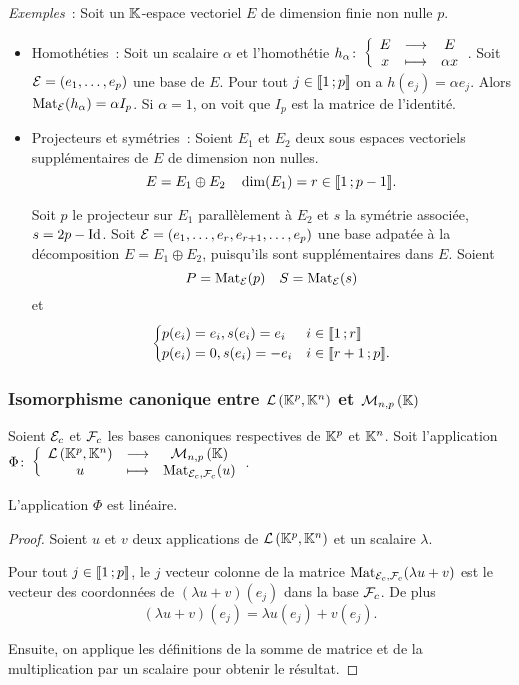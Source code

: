 \emph{Exemples}~: Soit un \(\mathbb{K}\)-espace vectoriel \(E\) de dimension finie non nulle \(p\).
\begin{itemize}
\item Homothéties~: Soit un scalaire \(\alpha\) et l'homothétie \(h_\alpha\colon \left\{\begin{array}{ccc} E & \longrightarrow &E\\ x & \longmapsto & \alpha x \end{array} \right.\). Soit \(\mathcal{E}=(e_1,\ldots, e_p)\) une base de \(E\). Pour tout \(j \in \mathopen{\llbracket}1\mathclose{}\mathpunct{};p\mathclose{\rrbracket}\) on a \(h(e_j)=\alpha e_j\). Alors \(\mathrm{Mat}_{\mathcal{E}}(h_\alpha)=\alpha I_p\). Si \(\alpha=1\), on voit que \(I_p\) est la matrice de l'identité.
\item Projecteurs et symétries~: Soient \(E_1\) et \(E_2\) deux sous espaces vectoriels supplémentaires de \(E\) de dimension non nulles.
  \begin{equation}
    E=E_1 \oplus E_2 \quad \dim(E_1)=r \in \mathopen{\llbracket}1\mathclose{}\mathpunct{};p-1\mathclose{\rrbracket}.
  \end{equation}

Soit \(p\) le projecteur sur \(E_1\) parallèlement à \(E_2\) et \(s\) la symétrie associée, \(s=2p -\operatorname{Id}\). Soit \(\mathcal{E}=(e_1, \ldots, e_r, e_{r+1}, \ldots, e_p)\) une base adpatée à la décomposition \(E=E_1 \oplus E_2\), puisqu'ils sont supplémentaires dans \(E\). Soient
\begin{equation}
  P=\mathrm{Mat}_{\mathcal{E}}(p) \quad S=\mathrm{Mat}_{\mathcal{E}}(s)
\end{equation}
et
\begin{equation}
  \begin{cases}
    p(e_i)=e_i, s(e_i)=e_i & i \in \mathopen{\llbracket}1\mathclose{}\mathpunct{};r\mathclose{\rrbracket} \\
    p(e_i)=0, s(e_i)=-e_i & i \in \mathopen{\llbracket}r+1\mathclose{}\mathpunct{};p\mathclose{\rrbracket}.
  \end{cases}
\end{equation}
\end{itemize}

\subsubsection{Isomorphisme canonique entre \(\mathcal{L}\left(\mathbb{K}^p,\mathbb{K}^n\right)\) et \(\mathcal{M}_{n,p}\left(\mathbb{K}\right)\)}


Soient \(\mathcal{E}_c\) et \(\mathcal{F}_c\) les bases canoniques respectives de \(\mathbb{K}^p\) et \(\mathbb{K}^n\). Soit l'application \(\Phi\colon \left\{\begin{array}{ccc} \mathcal{L}\left(\mathbb{K}^p,\mathbb{K}^n\right) & \longrightarrow &\mathcal{M}_{n,p}\left(\mathbb{K}\right)\\ u & \longmapsto & \mathrm{Mat}_{\mathcal{E}_c,\mathcal{F}_c}(u) \end{array} \right.\).

\begin{prop}
  L'application \(\Phi\) est linéaire.
\end{prop}
\begin{proof}
  Soient \(u\) et \(v\) deux applications de \(\mathcal{L}\left(\mathbb{K}^p,\mathbb{K}^n\right)\) et un scalaire \(\lambda\). 

Pour tout \(j \in \mathopen{\llbracket}1\mathclose{}\mathpunct{};p\mathclose{\rrbracket}\), le \(j\)\ieme{} vecteur colonne de la matrice \(\mathrm{Mat}_{\mathcal{E}_c,\mathcal{F}_c}(\lambda u+v)\) est le vecteur des coordonnées de \((\lambda u+v)(e_j)\) dans la base \(\mathcal{F}_c\). De plus
\begin{equation}
  (\lambda u+v)(e_j) = \lambda u(e_j) +v(e_j).
\end{equation}

Ensuite, on applique les définitions de la somme de matrice et de la multiplication par un scalaire pour obtenir le résultat.
\end{proof}

